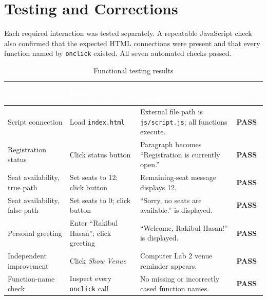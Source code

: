 \documentclass[11pt,a4paper]{article}
\newcommand{\statuspass}{\textcolor{success}{\textbf{PASS}}}
\begin{document}
\section{Testing and Corrections}

Each required interaction was tested separately. A repeatable JavaScript check also confirmed that the expected HTML connections were present and that every function named by \texttt{onclick} existed. All seven automated checks passed.

\begin{table}[H]
    \centering
    \footnotesize
    \caption{Functional testing results}
    \begin{tabularx}{\textwidth}{L{0.26\textwidth}L{0.23\textwidth}Y L{0.09\textwidth}}
        \toprule
        \textcolor{white}{\textbf{Test}} & \textcolor{white}{\textbf{Input or action}} & \textcolor{white}{\textbf{Expected and observed result}} & \textcolor{white}{\textbf{Status}} \\
        \midrule
        Script connection & Load \texttt{index.html} & External file path is \texttt{js/script.js}; all functions execute. & \statuspass \\
        Registration status & Click status button & Paragraph becomes ``Registration is currently open.'' & \statuspass \\
        Seat availability, true path & Set seats to 12; click button & Remaining-seat message displays 12. & \statuspass \\
        Seat availability, false path & Set seats to 0; click button & ``Sorry, no seats are available.'' is displayed. & \statuspass \\
        Personal greeting & Enter ``Rakibul Hasan''; click greeting & ``Welcome, Rakibul Hasan!'' is displayed. & \statuspass \\
        Independent improvement & Click \textit{Show Venue} & Computer Lab 2 venue reminder appears. & \statuspass \\
        Function-name check & Inspect every \texttt{onclick} call & No missing or incorrectly cased function names. & \statuspass \\
        \bottomrule
    \end{tabularx}
\end{table}
\end{document}
